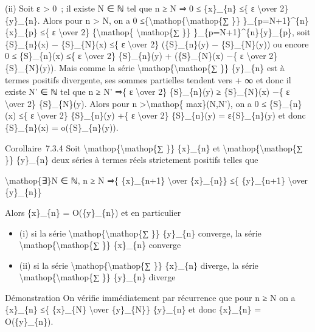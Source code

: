 \documentclass[]{article}
\begin{document}
(ii) Soit ε \textgreater{} 0~; il existe N ∈ ℕ tel que n ≥ N ⇒ 0 ≤
\{x\}\_\{n\} ≤\{ ε \textbackslash{}over 2\} \{y\}\_\{n\}. Alors pour n
\textgreater{} N, on a 0
≤\{\textbackslash{}mathop\{\textbackslash{}mathop\{∑ \}\}
\}\_\{p=N+1\}\^{}\{n\}\{x\}\_\{p\} ≤\{ ε \textbackslash{}over 2\}
\{\textbackslash{}mathop\{ \textbackslash{}mathop\{∑ \}\}
\}\_\{p=N+1\}\^{}\{n\}\{y\}\_\{p\}, soit \{S\}\_\{n\}(x) −
\{S\}\_\{N\}(x) ≤\{ ε \textbackslash{}over 2\} (\{S\}\_\{n\}(y) −
\{S\}\_\{N\}(y)) ou encore 0 ≤ \{S\}\_\{n\}(x) ≤\{ ε
\textbackslash{}over 2\} \{S\}\_\{n\}(y) + (\{S\}\_\{N\}(x) −\{ ε
\textbackslash{}over 2\} \{S\}\_\{N\}(y)). Mais comme la série
\textbackslash{}mathop\{\textbackslash{}mathop\{∑ \}\} \{y\}\_\{n\} est
à termes positifs divergente, ses sommes partielles tendent vers + ∞ et
donc il existe N' ∈ ℕ tel que n ≥ N' ⇒\{ ε \textbackslash{}over 2\}
\{S\}\_\{n\}(y) ≥ \{S\}\_\{N\}(x) −\{ ε \textbackslash{}over 2\}
\{S\}\_\{N\}(y). Alors pour n \textgreater{}\textbackslash{}mathop\{
max\}(N,N'), on a 0 ≤ \{S\}\_\{n\}(x) ≤\{ ε \textbackslash{}over 2\}
\{S\}\_\{n\}(y) +\{ ε \textbackslash{}over 2\} \{S\}\_\{n\}(y) =
ε\{S\}\_\{n\}(y) et donc \{S\}\_\{n\}(x) = o(\{S\}\_\{n\}(y)).

Corollaire~7.3.4 Soit \textbackslash{}mathop\{\textbackslash{}mathop\{∑
\}\} \{x\}\_\{n\} et \textbackslash{}mathop\{\textbackslash{}mathop\{∑
\}\} \{y\}\_\{n\} deux séries à termes réels strictement positifs telles
que

\textbackslash{}mathop\{∃\}N ∈ ℕ, n ≥ N ⇒\{ \{x\}\_\{n+1\}
\textbackslash{}over \{x\}\_\{n\}\} ≤\{ \{y\}\_\{n+1\}
\textbackslash{}over \{y\}\_\{n\}\}

Alors \{x\}\_\{n\} = O(\{y\}\_\{n\}) et en particulier

\begin{itemize}
\itemsep1pt\parskip0pt
\item
  (i) si la série \textbackslash{}mathop\{\textbackslash{}mathop\{∑ \}\}
  \{y\}\_\{n\} converge, la série
  \textbackslash{}mathop\{\textbackslash{}mathop\{∑ \}\} \{x\}\_\{n\}
  converge
\item
  (ii) si la série \textbackslash{}mathop\{\textbackslash{}mathop\{∑
  \}\} \{x\}\_\{n\} diverge, la série
  \textbackslash{}mathop\{\textbackslash{}mathop\{∑ \}\} \{y\}\_\{n\}
  diverge
\end{itemize}

Démonstration On vérifie immédiatement par récurrence que pour n ≥ N on
a \{x\}\_\{n\} ≤\{ \{x\}\_\{N\} \textbackslash{}over \{y\}\_\{N\}\}
\{y\}\_\{n\} et donc \{x\}\_\{n\} = O(\{y\}\_\{n\}).
\end{document}
